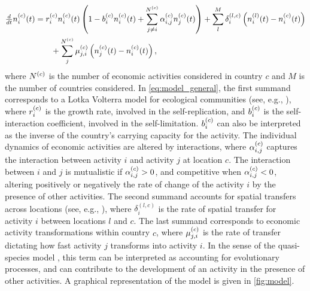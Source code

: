 \begin{equation}\label{eq:model_general}
  \begin{split}
    \tfrac{d}{dt} n_i^{(c)}(t)  &= r_i^{(c)}  n_i^{(c)}(t) \left(1 -   b_i^{(c)}  n_i^{(c)}(t)  + \sum_{j \neq i}^{N^{(c)}} \alpha^{(c)} _{i,j} n_j^{(c)}(t) \right) + \sum_l^M \delta^{(l,c)}_{i} \left( n_i^{(l)}(t) - n_i^{(c)}(t)  \right) \\
    &\qquad + \sum_j^{N^{(c)}} \mu^{(c)} _{j,i}\left( n_j^{(c)}(t)  - n_i^{(c)}(t)  \right),
  \end{split}
\end{equation}
where $N^{(c)}$ is the number of economic activities considered in country $c$ and $M$ is the number of countries considered.
% 
In \cref{eq:model_general}, the first summand corresponds to a Lotka Volterra model for ecological communities (see, e.g., \citep{Bunin2017,Scheffer2006a,Case1990}), where  $r_i^{(c)} $ is the growth rate, involved in the self-replication, and $b_i^{(c)} $ is the self-interaction coefficient, involved in the self-limitation. $b_i^{(c)} $ can also be interpreted as the inverse of the country's carrying capacity for the activity. %
%
The individual dynamics of economic activities are altered by interactions, where $\alpha_{i,j}^{(c)} $ captures the interaction between activity $ i $ and activity $ j $ at location $c$. The interaction between $i$ and $j$ is mutualistic if $\alpha_{i,j}^{(c)}  > 0$, and competitive when $\alpha_{i,j}^{(c)}  < 0$, altering positively or negatively the rate of change of the activity $i$ by the presence of other activities.
%
The second summand accounts for spatial transfers across locations (see, e.g., \citep{Tilman1994b}), where $\delta^{(l,c)}_{i}$ is the rate of spatial transfer for activity $i$ between locations $l$ and $c$.
% 
The last summand corresponds to economic activity transformations within country $c$, where $\mu^{(c)} _{j,i}$ is the rate of transfer dictating how fast activity $j$ transforms into activity $i$. In the sense of the quasi-species model \citep{eigen1988molecular}, this term can be interpreted as accounting for evolutionary processes, and can contribute to the development of an activity in the presence of other activities.
%
A graphical representation of the model is given in \cref{fig:model}.

